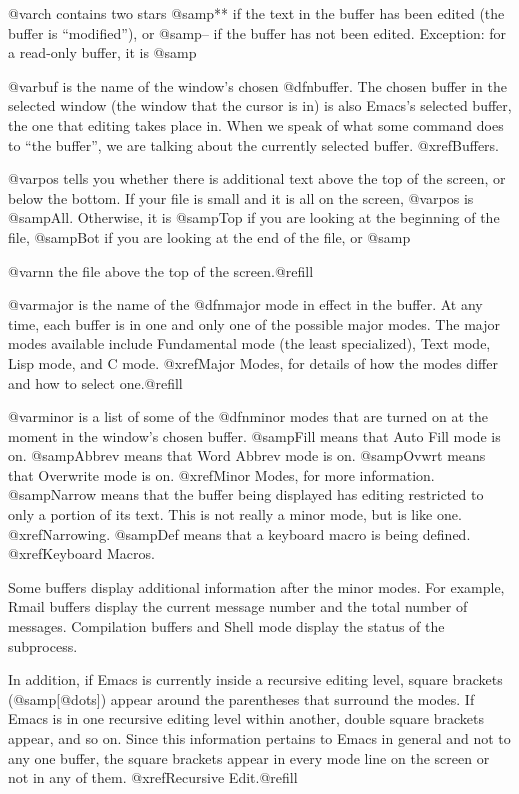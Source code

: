   @var{ch} contains two stars @samp{**} if the text in the buffer has been
edited (the buffer is ``modified''), or @samp{--} if the buffer has not been
edited.  Exception: for a read-only buffer, it is @samp{%

  @var{buf} is the name of the window's chosen @dfn{buffer}.  The chosen buffer
in the selected window (the window that the cursor is in) is also Emacs's
selected buffer, the one that editing takes place in.  When we speak of
what some command does to ``the buffer'', we are talking about the
currently selected buffer.  @xref{Buffers}.

  @var{pos} tells you whether there is additional text above the top of the
screen, or below the bottom.  If your file is small and it is all on the
screen, @var{pos} is @samp{All}.  Otherwise, it is @samp{Top} if you are
looking at the beginning of the file, @samp{Bot} if you are looking at the
end of the file, or @samp{@var{nn}%
the file above the top of the screen.@refill

  @var{major} is the name of the @dfn{major mode} in effect in the buffer.  At
any time, each buffer is in one and only one of the possible major modes.
The major modes available include Fundamental mode (the least specialized),
Text mode, Lisp mode, and C mode.  @xref{Major Modes}, for details
of how the modes differ and how to select one.@refill

  @var{minor} is a list of some of the @dfn{minor modes} that are turned on
at the moment in the window's chosen buffer.  @samp{Fill} means that Auto
Fill mode is on.  @samp{Abbrev} means that Word Abbrev mode is on.
@samp{Ovwrt} means that Overwrite mode is on.  @xref{Minor Modes}, for more
information.  @samp{Narrow} means that the buffer being displayed has
editing restricted to only a portion of its text.  This is not really a
minor mode, but is like one.  @xref{Narrowing}.  @samp{Def} means that a
keyboard macro is being defined.  @xref{Keyboard Macros}.

  Some buffers display additional information after the minor modes.  For
example, Rmail buffers display the current message number and the total
number of messages.  Compilation buffers and Shell mode display the status
of the subprocess.

  In addition, if Emacs is currently inside a recursive editing level,
square brackets (@samp{[@dots{}]}) appear around the parentheses that
surround the modes.  If Emacs is in one recursive editing level within
another, double square brackets appear, and so on.  Since this information
pertains to Emacs in general and not to any one buffer, the square brackets
appear in every mode line on the screen or not in any of them.
@xref{Recursive Edit}.@refill

}}
